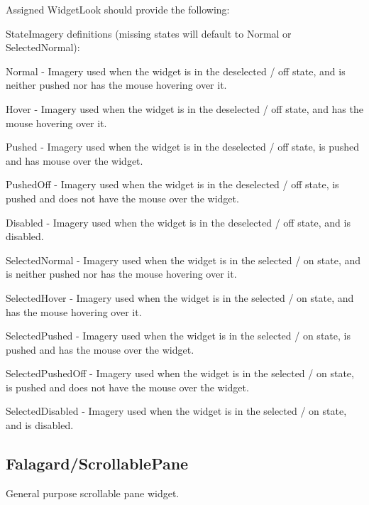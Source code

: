 Assigned Widget\+Look should provide the following\+: 
\begin{DoxyItemize}
\item State\+Imagery definitions (missing states will default to \textquotesingle{}Normal\textquotesingle{} or \textquotesingle{}Selected\+Normal\textquotesingle{})\+: 
\begin{DoxyItemize}
\item Normal -\/ Imagery used when the widget is in the deselected / off state, and is neither pushed nor has the mouse hovering over it. 
\item Hover -\/ Imagery used when the widget is in the deselected / off state, and has the mouse hovering over it. 
\item Pushed -\/ Imagery used when the widget is in the deselected / off state, is pushed and has mouse over the widget. 
\item Pushed\+Off -\/ Imagery used when the widget is in the deselected / off state, is pushed and does not have the mouse over the widget. 
\item Disabled -\/ Imagery used when the widget is in the deselected / off state, and is disabled. 
\item Selected\+Normal -\/ Imagery used when the widget is in the selected / on state, and is neither pushed nor has the mouse hovering over it. 
\item Selected\+Hover -\/ Imagery used when the widget is in the selected / on state, and has the mouse hovering over it. 
\item Selected\+Pushed -\/ Imagery used when the widget is in the selected / on state, is pushed and has the mouse over the widget. 
\item Selected\+Pushed\+Off -\/ Imagery used when the widget is in the selected / on state, is pushed and does not have the mouse over the widget. 
\item Selected\+Disabled -\/ Imagery used when the widget is in the selected / on state, and is disabled. 
\end{DoxyItemize}
\end{DoxyItemize}\hypertarget{fal_wr_ref_fal_wr_ref_sec_17}{}\subsection{Falagard/\+Scrollable\+Pane}\label{fal_wr_ref_fal_wr_ref_sec_17}
General purpose scrollable pane widget.

